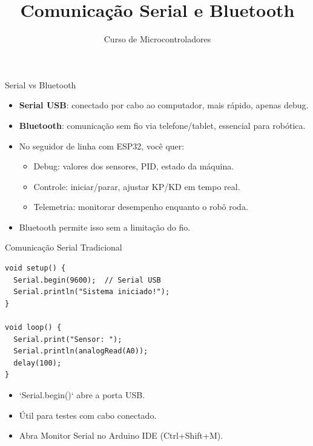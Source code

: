 \documentclass[10pt]{beamer}
\title{Comunicação Serial e Bluetooth}
\subtitle{Curso de Microcontroladores}
\author{}
\date{}
\begin{document}
\begin{frame}
  \titlepage
\end{frame}

\begin{frame}{Serial vs Bluetooth}
  \begin{itemize}
    \item \textbf{Serial USB}: conectado por cabo ao computador, mais rápido, apenas debug.
    \item \textbf{Bluetooth}: comunicação sem fio via telefone/tablet, essencial para robótica.
    \item No seguidor de linha com ESP32, você quer:
    \begin{itemize}
      \item Debug: valores dos sensores, PID, estado da máquina.
      \item Controle: iniciar/parar, ajustar KP/KD em tempo real.
      \item Telemetria: monitorar desempenho enquanto o robô roda.
    \end{itemize}
    \item Bluetooth permite isso sem a limitação do fio.
  \end{itemize}
\end{frame}

\begin{frame}[fragile]{Comunicação Serial Tradicional}
\begin{lstlisting}
void setup() {
  Serial.begin(9600);  // Serial USB
  Serial.println("Sistema iniciado!");
}

void loop() {
  Serial.print("Sensor: ");
  Serial.println(analogRead(A0));
  delay(100);
}
\end{lstlisting}

  \begin{itemize}
    \item `Serial.begin()` abre a porta USB.
    \item Útil para testes com cabo conectado.
    \item Abra Monitor Serial no Arduino IDE (Ctrl+Shift+M).
  \end{itemize}
\end{frame}
\end{document}
